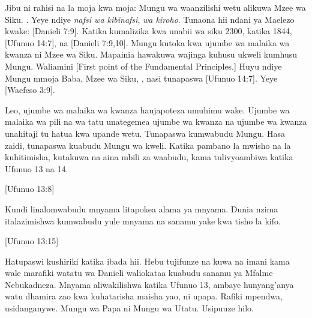 Jibu ni rahisi na la moja kwa moja: Mungu wa waanzilishi wetu alikuwa Mzee wa Siku. . Yeye ndiye \textit{nafsi wa kibinafsi}, \textit{wa kiroho}. Tunaona hii ndani ya Maelezo kwake: [Danieli 7:9]. Katika kumalizika kwa unabii wa siku 2300, katika 1844, [Ufunuo 14:7],  na [Danieli 7:9,10]. Mungu kutoka kwa ujumbe wa malaika wa kwanza ni Mzee wa Siku. Mapainia hawakuwa wajinga kuhusu ukweli kumhusu Mungu. Waliamini [First point of the Fundamental Principles.] Huyu ndiye Mungu mmoja Baba, Mzee wa Siku, , nasi tunapaswa [Ufunuo 14:7]. Yeye [Waefeso 3:9].


Leo, ujumbe wa malaika wa kwanza haujapoteza umuhimu wake. Ujumbe wa malaika wa pili na wa tatu unategemea ujumbe wa kwanza na ujumbe wa kwanza unahitaji tu hatua kwa upande wetu. Tunapaswa kumwabudu Mungu. Hasa zaidi, tunapaswa kuabudu Mungu wa kweli. Katika pambano la mwisho na la kuhitimisha, kutakuwa na aina mbili za waabudu, kama tulivyoambiwa katika Ufunuo 13 na 14.


[Ufunuo 13:8]


Kundi linalomwabudu mnyama litapokea alama ya mnyama. Dunia nzima italazimishwa kumwabudu yule mnyama na sanamu yake kwa tisho la kifo.


[Ufunuo 13:15]


Hatupaswi kushiriki katika ibada hii. Hebu tujifunze na kuwa na imani kama wale marafiki watatu wa Danieli waliokataa kuabudu sanamu ya Mfalme Nebukadneza. Mnyama aliwakilishwa katika Ufunuo 13, ambaye hunyang'anya watu dhamira zao kwa kuhatarisha maisha yao, ni upapa. Rafiki mpendwa, usidanganywe. Mungu wa Papa ni Mungu wa Utatu. Usipuuze hilo.


